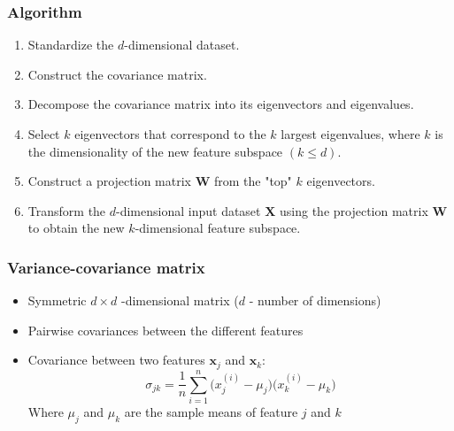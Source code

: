 \documentclass{beamer}
\begin{document}
\begin{frame}
  \frametitle{Algorithm}
  \begin{enumerate}
  \item Standardize the $d$-dimensional dataset.
  \item Construct the covariance matrix.
  \item Decompose the covariance matrix into its eigenvectors and eigenvalues.
  \item Select $k$ eigenvectors that correspond to the $k$ largest eigenvalues, where $k$ is the dimensionality of the new feature subspace $(k \le d)$.
  \item Construct a projection matrix $\mathbf{W}$ from the "top" $k$ eigenvectors.
  \item Transform the $d$-dimensional input dataset $\mathbf{X}$ using the projection matrix $\mathbf{W}$ to obtain the new $k$-dimensional feature subspace.
  \end{enumerate}
\end{frame}

\begin{frame}
  \frametitle{Variance-covariance matrix}
  \begin{itemize}
  \item Symmetric $d \times d$ -dimensional matrix ($d$ - number of dimensions)
  \item Pairwise covariances between the different features
  \item Covariance between two features $\mathbf{x}_j$ and $\mathbf{x}_k$:
    \[
    \sigma_{jk} = \frac{1}{n} \sum_{i=1}^{n} \big(  x_{j}^{(i)} - \mu_j  \big) \big(  x_{k}^{(i)}  - \mu_k \big)
    \]
    Where $\mu_j$ and $\mu_k$ are the sample means of feature $j$ and $k$
  \end{itemize}
  
\end{frame}
\end{document}
